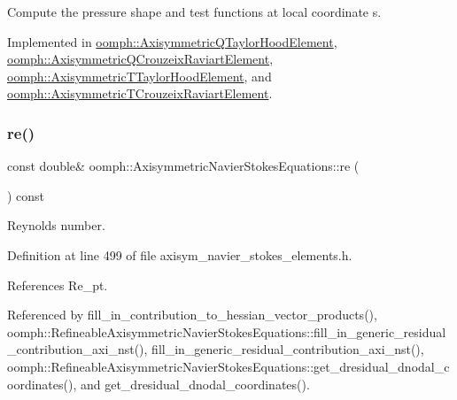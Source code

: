 Compute the pressure shape and test functions at local coordinate s. 



Implemented in \hyperlink{classoomph_1_1AxisymmetricQTaylorHoodElement_abdb9779d344d9dbe51260e8d01852737}{oomph\+::\+Axisymmetric\+Q\+Taylor\+Hood\+Element}, \hyperlink{classoomph_1_1AxisymmetricQCrouzeixRaviartElement_af131ceee4d1612696b66ce7ac3a866d1}{oomph\+::\+Axisymmetric\+Q\+Crouzeix\+Raviart\+Element}, \hyperlink{classoomph_1_1AxisymmetricTTaylorHoodElement_acaeacbb982949d5f9c6b3afec8b98de9}{oomph\+::\+Axisymmetric\+T\+Taylor\+Hood\+Element}, and \hyperlink{classoomph_1_1AxisymmetricTCrouzeixRaviartElement_adb45e981a3fbe7894f14264bd13e1b7f}{oomph\+::\+Axisymmetric\+T\+Crouzeix\+Raviart\+Element}.

\mbox{\label{classoomph_1_1AxisymmetricNavierStokesEquations_a5326eb9f37e9ca42103ea7c72622a415}} 
\subsubsection{\texorpdfstring{re()}{re()}}
{\footnotesize\ttfamily const double\& oomph\+::\+Axisymmetric\+Navier\+Stokes\+Equations\+::re (\begin{DoxyParamCaption}{ }\end{DoxyParamCaption}) const\hspace{0.3cm}{\ttfamily [inline]}}



Reynolds number. 



Definition at line 499 of file axisym\+\_\+navier\+\_\+stokes\+\_\+elements.\+h.



References Re\+\_\+pt.



Referenced by fill\+\_\+in\+\_\+contribution\+\_\+to\+\_\+hessian\+\_\+vector\+\_\+products(), oomph\+::\+Refineable\+Axisymmetric\+Navier\+Stokes\+Equations\+::fill\+\_\+in\+\_\+generic\+\_\+residual\+\_\+contribution\+\_\+axi\+\_\+nst(), fill\+\_\+in\+\_\+generic\+\_\+residual\+\_\+contribution\+\_\+axi\+\_\+nst(), oomph\+::\+Refineable\+Axisymmetric\+Navier\+Stokes\+Equations\+::get\+\_\+dresidual\+\_\+dnodal\+\_\+coordinates(), and get\+\_\+dresidual\+\_\+dnodal\+\_\+coordinates().

